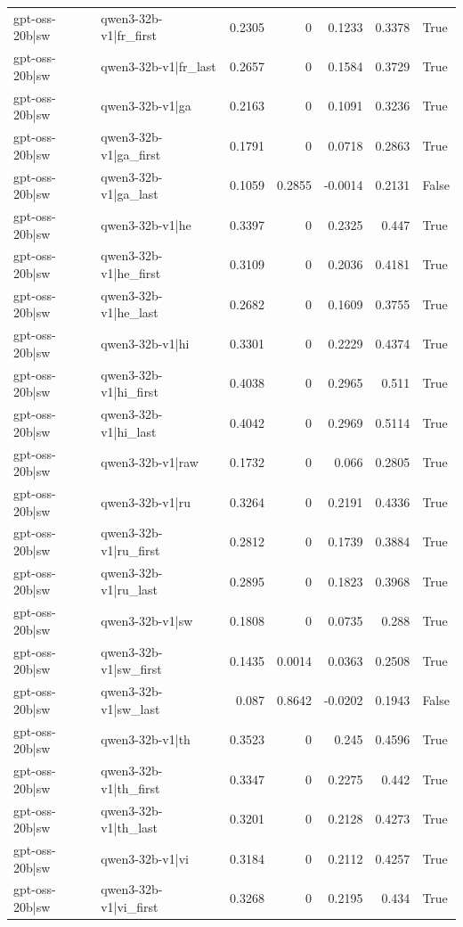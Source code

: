 \begin{table}
\begin{tabular}{l l r r r r l}
gpt-oss-20b|sw & qwen3-32b-v1|fr_first & 0.2305 & 0 & 0.1233 & 0.3378 & True \\
gpt-oss-20b|sw & qwen3-32b-v1|fr_last & 0.2657 & 0 & 0.1584 & 0.3729 & True \\
gpt-oss-20b|sw & qwen3-32b-v1|ga & 0.2163 & 0 & 0.1091 & 0.3236 & True \\
gpt-oss-20b|sw & qwen3-32b-v1|ga_first & 0.1791 & 0 & 0.0718 & 0.2863 & True \\
gpt-oss-20b|sw & qwen3-32b-v1|ga_last & 0.1059 & 0.2855 & -0.0014 & 0.2131 & False \\
gpt-oss-20b|sw & qwen3-32b-v1|he & 0.3397 & 0 & 0.2325 & 0.447 & True \\
gpt-oss-20b|sw & qwen3-32b-v1|he_first & 0.3109 & 0 & 0.2036 & 0.4181 & True \\
gpt-oss-20b|sw & qwen3-32b-v1|he_last & 0.2682 & 0 & 0.1609 & 0.3755 & True \\
gpt-oss-20b|sw & qwen3-32b-v1|hi & 0.3301 & 0 & 0.2229 & 0.4374 & True \\
gpt-oss-20b|sw & qwen3-32b-v1|hi_first & 0.4038 & 0 & 0.2965 & 0.511 & True \\
gpt-oss-20b|sw & qwen3-32b-v1|hi_last & 0.4042 & 0 & 0.2969 & 0.5114 & True \\
gpt-oss-20b|sw & qwen3-32b-v1|raw & 0.1732 & 0 & 0.066 & 0.2805 & True \\
gpt-oss-20b|sw & qwen3-32b-v1|ru & 0.3264 & 0 & 0.2191 & 0.4336 & True \\
gpt-oss-20b|sw & qwen3-32b-v1|ru_first & 0.2812 & 0 & 0.1739 & 0.3884 & True \\
gpt-oss-20b|sw & qwen3-32b-v1|ru_last & 0.2895 & 0 & 0.1823 & 0.3968 & True \\
gpt-oss-20b|sw & qwen3-32b-v1|sw & 0.1808 & 0 & 0.0735 & 0.288 & True \\
gpt-oss-20b|sw & qwen3-32b-v1|sw_first & 0.1435 & 0.0014 & 0.0363 & 0.2508 & True \\
gpt-oss-20b|sw & qwen3-32b-v1|sw_last & 0.087 & 0.8642 & -0.0202 & 0.1943 & False \\
gpt-oss-20b|sw & qwen3-32b-v1|th & 0.3523 & 0 & 0.245 & 0.4596 & True \\
gpt-oss-20b|sw & qwen3-32b-v1|th_first & 0.3347 & 0 & 0.2275 & 0.442 & True \\
gpt-oss-20b|sw & qwen3-32b-v1|th_last & 0.3201 & 0 & 0.2128 & 0.4273 & True \\
gpt-oss-20b|sw & qwen3-32b-v1|vi & 0.3184 & 0 & 0.2112 & 0.4257 & True \\
gpt-oss-20b|sw & qwen3-32b-v1|vi_first & 0.3268 & 0 & 0.2195 & 0.434 & True \\

\end{tabular}
\end{table}
